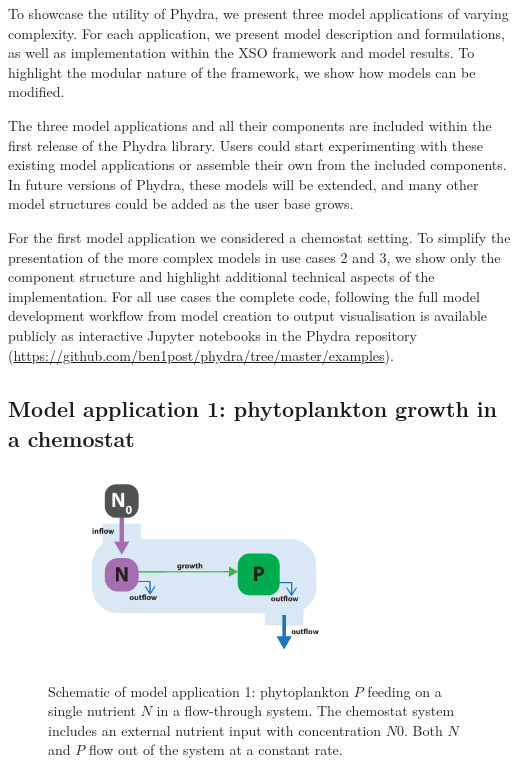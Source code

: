 \documentclass[journal abbreviation, manuscript]{copernicus}
\begin{document}
To showcase the utility of Phydra, we present three model applications of varying complexity. For each application, we present model description and formulations, as well as implementation within the XSO framework and model results. To highlight the modular nature of the framework, we show how models can be modified.

The three model applications and all their components are included within the first release of the Phydra library. Users could start experimenting with these existing model applications or assemble their own from the included components. In future versions of Phydra, these models will be extended, and many other model structures could be added as the user base grows.

For the first model application we considered a chemostat setting. To simplify the presentation of the more complex models in use cases 2 and 3, we show only the component structure and highlight additional technical aspects of the implementation. For all use cases the complete code, following the full model development workflow from model creation to output visualisation is available publicly as interactive Jupyter notebooks in the Phydra repository (\url{https://github.com/ben1post/phydra/tree/master/examples}).

\subsection{Model application 1: phytoplankton growth in a chemostat}

\begin{figure}[t]
\includegraphics[width=8.3cm]{Figures/firstdraft_schematics/01_schematics_Chemostat.pdf}
\caption{Schematic of model application 1: phytoplankton $P$ feeding on a single nutrient $N$ in a flow-through system. The chemostat system includes an external nutrient input with concentration $N0$. Both $N$ and $P$ flow out of the system at a constant rate.}
\label{Figure:ModelSchematics_1}
\end{figure}
\end{document}
